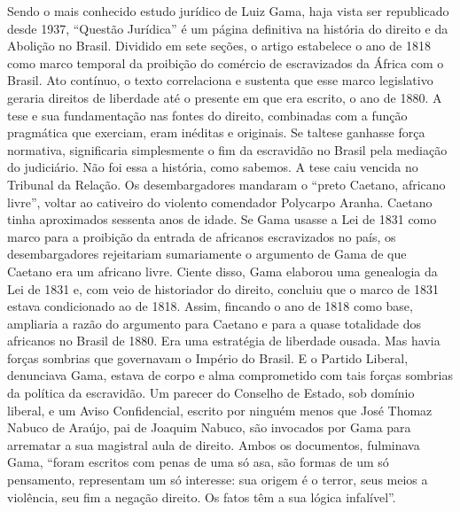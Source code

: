 {\small\noindent
Sendo o mais conhecido estudo
jurídico de Luiz Gama, haja vista ser republicado desde 1937, ``Questão
Jurídica'' é um página definitiva na história do direito e da Abolição no
Brasil. Dividido em sete seções, o artigo estabelece o ano de 1818 como
marco temporal da proibição do comércio de escravizados da África com o
Brasil. Ato contínuo, o texto correlaciona e sustenta que esse marco
legislativo geraria direitos de liberdade até o presente em que era
escrito, o ano de 1880. A tese e sua fundamentação nas fontes do
direito, combinadas com a função pragmática que exerciam, eram
inéditas e originais. Se taltese ganhasse força normativa,
significaria simplesmente o fim da escravidão no
Brasil pela mediação do judiciário. Não foi essa a história, como
sabemos. A tese caiu vencida no Tribunal da Relação. Os desembargadores
mandaram o ``preto Caetano, africano livre'', voltar ao cativeiro do
violento comendador Polycarpo Aranha. Caetano tinha aproximados sessenta
anos de idade. Se Gama usasse a Lei de 1831 como marco para a proibição
da entrada de africanos escravizados no país, os desembargadores
rejeitariam sumariamente o argumento de Gama de que Caetano era um
africano livre. Ciente disso, Gama elaborou uma genealogia da Lei de
1831 e, com veio de historiador do direito, concluiu que o marco de 1831
estava condicionado ao de 1818. Assim, fincando o ano de 1818 como base,
ampliaria a razão do argumento para Caetano e para a quase totalidade
dos africanos no Brasil de 1880. Era uma estratégia de liberdade ousada.
Mas havia forças sombrias que governavam o Império do Brasil. E o Partido Liberal,
denunciava Gama, estava de corpo e alma comprometido com tais forças
sombrias da política da escravidão. Um parecer do Conselho de Estado,
sob domínio liberal, e um Aviso Confidencial, escrito por ninguém menos
que José Thomaz Nabuco de Araújo, pai de Joaquim Nabuco, são invocados
por Gama para arrematar a sua magistral aula de direito. Ambos os
documentos, fulminava Gama, ``foram escritos com penas de uma só asa, são
formas de um só pensamento, representam um só interesse: sua origem é o
terror, seus meios a violência, seu fim a negação direito. Os fatos têm
a sua lógica infalível''. }



